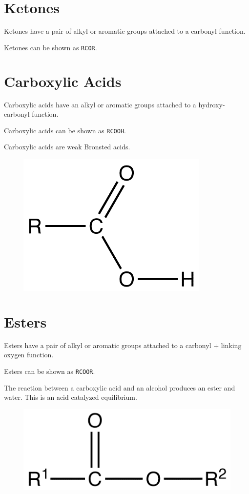 \documentclass[oneside]{book} %
\theoremstyle{plain}
\begin{document}
\section{Ketones}
Ketones have a pair of alkyl or aromatic groups attached to a carbonyl function.

Ketones can be shown as \texttt{RCOR}.

\section{Carboxylic Acids}
Carboxylic acids have an alkyl or aromatic groups attached to a hydroxy-carbonyl
function.

Carboxylic acids can be shown as \texttt{RCOOH}.

Carboxylic acids are weak Bronsted acids.

\begin{figure}[ht]
\includegraphics{carboxylic_acid.png}
\centering
\end{figure}

\section{Esters}
Esters have a pair of alkyl or aromatic groups attached to a carbonyl + linking
oxygen function.

Esters can be shown as \texttt{RCOOR}.

The reaction between a carboxylic acid and an alcohol produces an ester and
water.
This is an acid catalyzed equilibrium.

\begin{figure}[ht]
\includegraphics{ester.png}
\centering
\end{figure}
\end{document}
